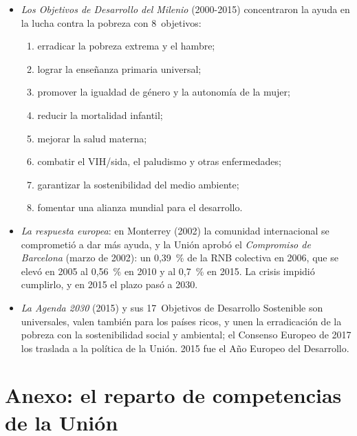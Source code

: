\documentclass[11pt]{article}
\begin{document}
\begin{itemize}
\item \emph{Los Objetivos de Desarrollo del Milenio} (2000-2015) concentraron la ayuda en la lucha contra la pobreza con 8~objetivos:
  \begin{enumerate}
  \item erradicar la pobreza extrema y el hambre;
  \item lograr la enseñanza primaria universal;
  \item promover la igualdad de género y la autonomía de la mujer;
  \item reducir la mortalidad infantil;
  \item mejorar la salud materna;
  \item combatir el VIH/sida, el paludismo y otras enfermedades;
  \item garantizar la sostenibilidad del medio ambiente;
  \item fomentar una alianza mundial para el desarrollo.
  \end{enumerate}
\item \emph{La respuesta europea}: en Monterrey (2002) la comunidad internacional se comprometió a dar más ayuda, y la Unión aprobó el \emph{Compromiso de Barcelona} (marzo de 2002): un 0,39~\% de la RNB colectiva en 2006, que se elevó en 2005 al 0,56~\% en 2010 y al 0,7~\% en 2015. La crisis impidió cumplirlo, y en 2015 el plazo pasó a 2030\nocite{Consejo2015FfD}.
\item \emph{La Agenda 2030} (2015) y sus 17~Objetivos de Desarrollo Sostenible son universales, valen también para los países ricos, y unen la erradicación de la pobreza con la sostenibilidad social y ambiental; el Consenso Europeo de 2017 los traslada a la política de la Unión. 2015 fue el Año Europeo del Desarrollo.
\end{itemize}

\section{Anexo: el reparto de competencias\cortetitulo{} de la Unión}\label{anexo:competencias}
\end{document}
